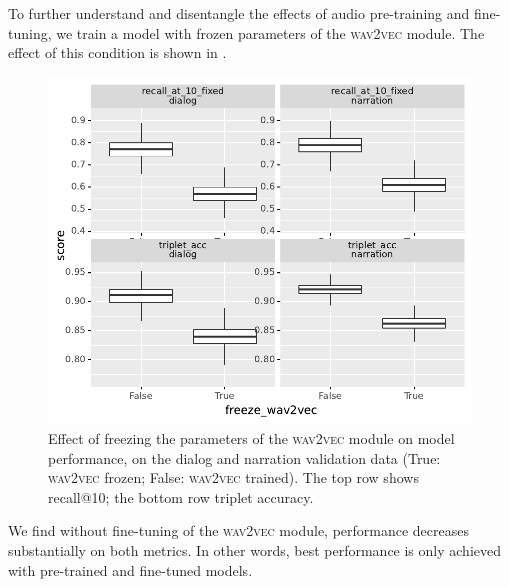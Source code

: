 To further understand and disentangle the effects of audio pre-training and 
fine-tuning, we train a model with frozen parameters of the 
\textsc{wav2vec} module. The effect of this condition is shown in .
\begin{figure}[htb]
  \centering
  \includegraphics[width=\columnwidth]{results/ablations/freeze_wav2vec.pdf}
  \caption{Effect of freezing the parameters of the \textsc{wav2vec}
    module on model performance, on the dialog and narration
    validation data (True: \textsc{wav2vec} frozen; False:
    \textsc{wav2vec} trained). The top row
    shows recall@10; the bottom row triplet accuracy.}
  \label{fig:freeze_wav2vec}
\end{figure}
We find without fine-tuning of the \textsc{wav2vec} module, performance decreases substantially 
on both metrics. In other words, best performance is only achieved with pre-trained and 
fine-tuned models.


